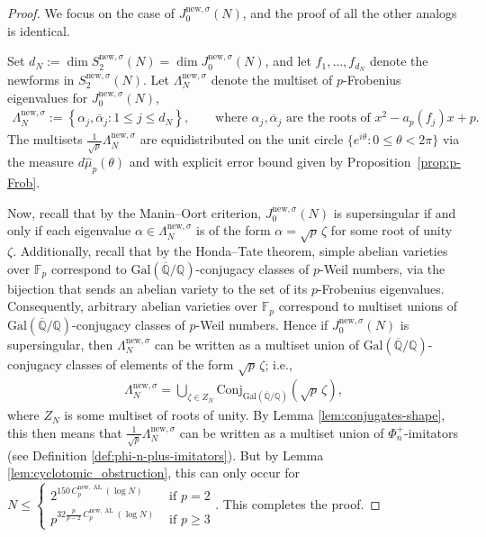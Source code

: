 \documentclass[11pt,letterpaper,reqno]{amsart}
\theoremstyle{definition}
\numberwithin{equation}{section}
\numberwithin{figure}{section}
\numberwithin{table}{section}
\newcommand{\lrcb}[1]{\!\left\{#1\right\}}
\newcommand{\nw}{\mathrm{new}}
\begin{document}
\begin{proof}
We focus on the case of $J_0^{\nw, \sigma}(N)$, and the proof of all the other analogs is identical.

Set $d_N:=\dim S_2^{\mathrm{new},\sigma}(N)=\dim J_0^{\nw, \sigma}(N)$, and let $f_1,\dots,f_{d_N}$
denote the newforms in \(S_2^{\mathrm{new},\sigma}(N)\).
Let $\Lambda_N^{\nw, \sigma}$ denote the multiset of \(p\)-Frobenius eigenvalues for $J_0^{\nw, \sigma}(N)$,
\begin{align}
    \Lambda_N^{\nw, \sigma} := \lrcb{ \alpha_j, \overline \alpha_j : 1 \le j \le d_N}, \qquad \text{where } \alpha_j, \overline\alpha_j \text{ are the roots of $x^2-a_p(f_j)x+p$.}
\end{align}
The multisets
$
\frac{1}{\sqrt p}
\Lambda_N^{\nw, \sigma}
$
are equidistributed on the unit circle
\(
\{e^{i\theta}:0\le\theta<2\pi\}
\)
via the measure \(d\hat\mu_p(\theta)\) and with explicit error bound given by Proposition~\ref{prop:p-Frob}. 

Now, recall that by the Manin--Oort criterion, $J_0^{\nw, \sigma}(N)$ is supersingular if and only if each eigenvalue $\alpha \in \Lambda_N^{\nw, \sigma}$ is of the form $\alpha = \sqrt p\,\zeta$ for some root of unity \(\zeta\). Additionally, recall that by the Honda–Tate theorem, simple abelian varieties over $\mathbb{F}_p$ correspond to $\mathrm{Gal}(\overline{\mathbb{Q}}/\mathbb{Q})$-conjugacy classes of $p$-Weil numbers, via the bijection that sends an abelian variety to the set of its $p$-Frobenius eigenvalues. Consequently, arbitrary abelian varieties over $\mathbb{F}_p$ correspond to multiset unions of $\mathrm{Gal}(\overline{\mathbb{Q}}/\mathbb{Q})$-conjugacy classes of $p$-Weil numbers.
Hence if $J_0^{\nw, \sigma}(N)$ is supersingular, then
$\Lambda_N^{\nw, \sigma}$ can be written as a multiset union of $\text{Gal}(\overline{\mathbb{Q}}/\mathbb{Q})$-conjugacy classes of elements of the form $\sqrt p\,\zeta$; i.e.,
\begin{align}
    \Lambda_N^{\nw, \sigma} = \bigcup_{\zeta \in Z_N} \mathrm{Conj}_{\text{Gal}(\overline{\mathbb{Q}}/\mathbb{Q})}(\sqrt p \,\zeta),
\end{align}
where $Z_N$ is some multiset of roots of unity. 
By Lemma \ref{lem:conjugates-shape}, this then means that $\frac{1}{\sqrt{p}} \Lambda_N^{\nw, \sigma}$ can be written as a multiset union of $\Phi_n^+$-imitators (see Definition \ref{def:phi-n-plus-imitators}). But by Lemma \ref{lem:cyclotomic_obstruction}, this can only occur for 
$
    N \leq
    \begin{cases}
         2^{150 \, C_p^{\nw,\operatorname{AL}}(\log N)} 
        & \text{ if } p=2 \\
        p^{ 32\frac{p}{p-2} \, C_p^{\nw,\operatorname{AL}}(\log N)}
        & \text{ if } p \geq 3
    \end{cases}
$. This completes the proof.
\end{proof}
\end{document}
